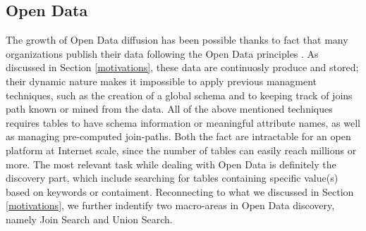 \subsection{Open Data}
The growth of Open Data diffusion has been possible thanks to fact that many organizations publish their data following the Open Data principles \cite{bizer2009linked}. As discussed in Section \ref{motivations}, these data are continuosly produce and stored; their dynamic nature makes it impossible to apply previous managment techniques, such as the creation of a global schema \cite{10.1145/27633.27634} and to keeping track of joins path known or mined from the data\cite{fagin2009clio,deng2017data}. All of the above mentioned techniques requires tables to have schema information or meaningful attribute names, as well as managing pre-computed join-paths. Both the fact are intractable for an open platform at Internet scale, since the number of tables can easily reach millions or more. The most relevant task while dealing with Open Data is definitely the discovery part, which include searching for tables containing specific value(s) based on keywords \cite{brickley2019google} or contaiment. Reconnecting to what we discussed in Section \ref{motivations}, we further indentify two macro-areas in Open Data discovery, namely Join Search and Union Search.
\bigbreak

